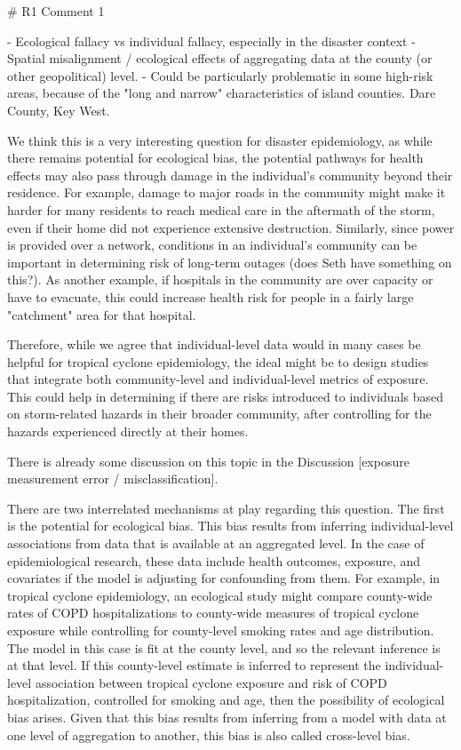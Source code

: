 # R1 Comment 1

- Ecological fallacy vs individual fallacy, especially in the disaster context
- Spatial misalignment / ecological effects of aggregating data at the county
(or other geopolitical) level. 
- Could be particularly problematic in some high-risk areas, because of the 
"long and narrow" characteristics of island counties. Dare County, Key West. 

We think this is a very interesting question for disaster epidemiology, as
while there remains potential for ecological bias, the potential pathways for
health effects may also pass through damage in the individual's community beyond
their residence. For example, damage to major roads in the community might make
it harder for many residents to reach medical care in the aftermath of the
storm, even if their home did not experience extensive destruction. Similarly,
since power is provided over a network, conditions in an individual's community
can be important in determining risk of long-term outages (does Seth have
something on this?). As another example, if hospitals in the community are 
over capacity or have to evacuate, this could increase health risk for people in 
a fairly large "catchment" area for that hospital. 

Therefore, while we agree that individual-level data would in many cases be
helpful for tropical cyclone epidemiology, the ideal might be to design studies
that integrate both community-level and individual-level metrics of exposure.
This could help in determining if there are risks introduced to individuals
based on storm-related hazards in their broader community, after controlling for
the hazards experienced directly at their homes.

There is already some discussion on this topic in the Discussion [exposure 
measurement error / misclassification].

There are two interrelated mechanisms at play regarding this question. The
first is the potential for ecological bias. This bias results from inferring
individual-level associations from data that is available at an aggregated level. 
In the case of epidemiological research, these data include health outcomes, 
exposure, and covariates if the model is adjusting for confounding from them.
For example, in tropical cyclone epidemiology, an ecological study might 
compare county-wide rates of COPD hospitalizations to county-wide measures
of tropical cyclone exposure while controlling for county-level smoking 
rates and age distribution. The model in this case is fit at the county level, 
and so the relevant inference is at that level. If this county-level estimate
is inferred to represent the individual-level association between tropical 
cyclone exposure and risk of COPD hospitalization, controlled for smoking and
age, then the possibility of ecological bias arises. Given that this bias
results from inferring from a model with data at one level of aggregation
to another, this bias is also called cross-level bias. 

